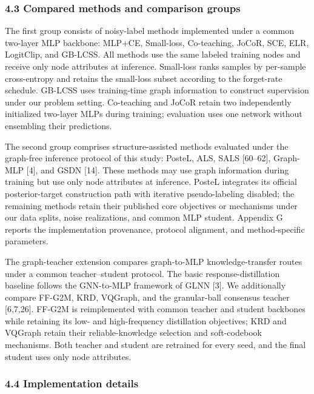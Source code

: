 \subsubsection{4.3 Compared methods and comparison groups}\label{compared-methods-and-comparison-groups}

The first group consists of noisy-label methods implemented under a common two-layer MLP backbone: MLP+CE, Small-loss, Co-teaching, JoCoR, SCE, ELR, LogitClip, and GB-LCSS. All methods use the same labeled training nodes and receive only node attributes at inference. Small-loss ranks samples by per-sample cross-entropy and retains the small-loss subset according to the forget-rate schedule. GB-LCSS uses training-time graph information to construct supervision under our problem setting. Co-teaching and JoCoR retain two independently initialized two-layer MLPs during training; evaluation uses one network without ensembling their predictions.

The second group comprises structure-assisted methods evaluated under the graph-free inference protocol of this study: PosteL, ALS, SALS {[}60--62{]}, Graph-MLP {[}4{]}, and GSDN {[}14{]}. These methods may use graph information during training but use only node attributes at inference. PosteL integrates its official posterior-target construction path with iterative pseudo-labeling disabled; the remaining methods retain their published core objectives or mechanisms under our data splits, noise realizations, and common MLP student. Appendix G reports the implementation provenance, protocol alignment, and method-specific parameters.

The graph-teacher extension compares graph-to-MLP knowledge-transfer routes under a common teacher--student protocol. The basic response-distillation baseline follows the GNN-to-MLP framework of GLNN {[}3{]}. We additionally compare FF-G2M, KRD, VQGraph, and the granular-ball consensus teacher {[}6,7,26{]}. FF-G2M is reimplemented with common teacher and student backbones while retaining its low- and high-frequency distillation objectives; KRD and VQGraph retain their reliable-knowledge selection and soft-codebook mechanisms. Both teacher and student are retrained for every seed, and the final student uses only node attributes.

\subsubsection{4.4 Implementation details}\label{implementation-details}

